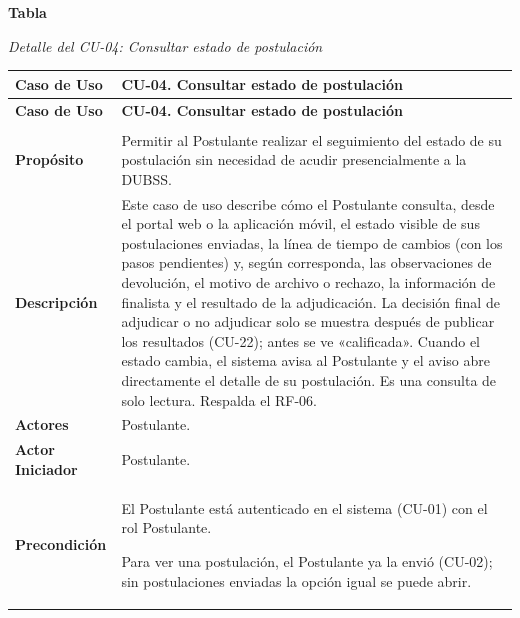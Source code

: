 \label{tab:detalle_cu04}
\noindent\textbf{Tabla~\thetable}\par\nopagebreak
\noindent\textit{Detalle del CU-04: Consultar estado de postulación}\par\nopagebreak
\begingroup\small\linespread{1}\selectfont
\begin{longtable}{>{\raggedright\arraybackslash}p{2.9cm} >{\raggedright\arraybackslash}p{12.6cm}}
\toprule
\textbf{Caso de Uso} & \textbf{CU-04. Consultar estado de postulación} \\
\midrule
\endfirsthead
\toprule
\textbf{Caso de Uso} & \textbf{CU-04. Consultar estado de postulación} \\
\midrule
\endhead
\endfoot
\bottomrule
\multicolumn{2}{l}{\textit{Nota.} Elaboración propia.} \\
\endlastfoot
\textbf{Propósito} & Permitir al Postulante realizar el seguimiento del estado de su postulación sin necesidad de acudir presencialmente a la DUBSS. \\
\midrule
\textbf{Descripción} & Este caso de uso describe cómo el Postulante consulta, desde el portal web o la aplicación móvil, el estado visible de sus postulaciones enviadas, la línea de tiempo de cambios (con los pasos pendientes) y, según corresponda, las observaciones de devolución, el motivo de archivo o rechazo, la información de finalista y el resultado de la adjudicación. La decisión final de adjudicar o no adjudicar solo se muestra después de publicar los resultados (CU-22); antes se ve «calificada». Cuando el estado cambia, el sistema avisa al Postulante y el aviso abre directamente el detalle de su postulación. Es una consulta de solo lectura. Respalda el RF-06. \\
\midrule
\textbf{Actores} & Postulante. \\
\midrule
\textbf{Actor Iniciador} & Postulante. \\
\midrule
\textbf{Precondición} & \vspace{-\baselineskip}\begin{cuvin}
    \item El Postulante está autenticado en el sistema (CU-01) con el rol Postulante.
    \item Para ver una postulación, el Postulante ya la envió (CU-02); sin postulaciones enviadas la opción igual se puede abrir.
\end{cuvin} \\

\end{longtable}
